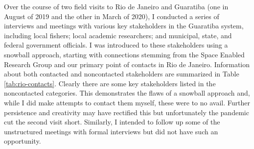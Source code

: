 Over the course of two field visits to Rio de Janeiro and Guaratiba (one in August of 2019 and the other in March of 2020), I conducted a series of interviews and meetings with various key stakeholders in the Guaratiba system, including local fishers; local academic researchers; and municipal, state, and federal government officials. I was introduced to these stakeholders using a snowball approach, starting with connections stemming from the Space Enabled Research Group and our primary point of contacts in Rio de Janeiro. Information about both contacted and noncontacted stakeholders are summarized in Table \ref{tab:rio-contacts}. Clearly there are some key stakeholders listed in the noncontacted categories. This demonstrates the flaws of a snowball approach and, while I did make attempts to contact them myself, these were to no avail. Further persistence and creativity may have rectified this but unfortunately the pandemic cut the second visit short. Similarly, I intended to follow up some of the unstructured meetings with formal interviews but did not have such an opportunity.

